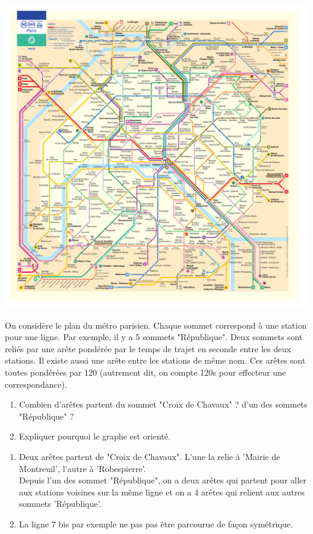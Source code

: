 \begin{center}
\includegraphics[scale=0.3]{metro/Plan.pdf}
\end{center}
On considère le plan du métro parisien. Chaque sommet correspond à une station pour une ligne. Par exemple, il y a 5 sommets "République". Deux sommets sont reliés par une arête pondérée par le temps de trajet en seconde entre les deux stations. Il existe aussi une arête entre les stations de même nom. Ces arêtes sont toutes pondérées par 120 (autrement dit, on compte 120s pour effecteur une correspondance).

\begin{exercice}
\begin{enumerate}
\item Combien d'arêtes partent du sommet "Croix de Chavaux" ? d'un des sommets "République" ?
\item Expliquer pourquoi le graphe est orienté.
\end{enumerate}
\end{exercice}

\begin{solution}
\begin{enumerate}
\item Deux arêtes partent de "Croix de Chavaux". L'une la relie à 'Mairie de Montreuil', l'autre à 'Robespierre'.\\
Depuis l'un des sommet "République", on a deux arêtes qui partent pour aller aux stations voisines sur la même ligne et on a 4 arêtes qui relient aux autres sommets 'République'.
\item La ligne 7 bis par exemple ne pas pas être parcourue de façon symétrique.
\end{enumerate}
\end{solution}


